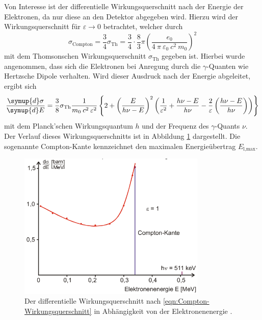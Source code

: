 Von Interesse ist der differentielle Wirkungsquerschnitt nach der Energie der
Elektronen, da nur diese an den Detektor abgegeben wird. Hierzu
wird der Wirkungsquerschnitt für $\varepsilon \rightarrow 0$ betrachtet,
welcher durch
\begin{equation*}
	\sigma_\text{Compton} = \frac{3}{4} \sigma_\text{Th}
	= \frac{3}{4} \cdot \frac{8}{3} \pi
	\left(\frac{e_0}{4\:\pi\:\varepsilon_0\:c^2\:m_0}\right)^2
\end{equation*}
mit dem Thomsonschen Wirkungsquerschnitt $\sigma_\text{Th}$ gegeben ist.
Hierbei wurde angenommen, dass sich die Elektronen bei Anregung durch die
$\gamma$-Quanten wie Hertzsche Dipole verhalten.
Wird dieser Ausdruck nach der Energie abgeleitet, ergibt sich
\begin{equation}
	\frac{\symup{d}\sigma}{\symup{d}E} =
	\frac{3}{8} \sigma_\text{Th} \frac{1}{m_0\:c^2\:\varepsilon^2}
	\left\{2 + \left(\frac{E}{h \nu - E}\right)^2
	\left(\frac{1}{\varepsilon^2} + \frac{h \nu - E}{h \nu} - \frac{2}{\varepsilon}
	\left(\frac{h \nu - E}{h \nu}\right)\right)\right\}
	\label{eqn:Compton-Wirkungsquerschnitt}
\end{equation}
mit dem Planck'schen Wirkungsquantum $h$ und der Frequenz des $\gamma$-Quants $\nu$.
Der Verlauf dieses Wirkungsquerschnitts ist in Abbildung \ref{fig:Compton-Wirkungsquerschnitt}
dargestellt. Die sogenannte Compton-Kante kennzeichnet den maximalen Energieübertrag
$E_\text{l,max}$.

\begin{figure}
	\centering
	\includegraphics[height=7.0cm]{images/Compton-Wirkungsquerschnitt.pdf}
	\caption{Der differentielle Wirkungsquerschnitt nach \eqref{eqn:Compton-Wirkungsquerschnitt}
	in Abhängigkeit von der Elektronenenergie \cite[7]{anleitung}.}
	\label{fig:Compton-Wirkungsquerschnitt}
\end{figure}

